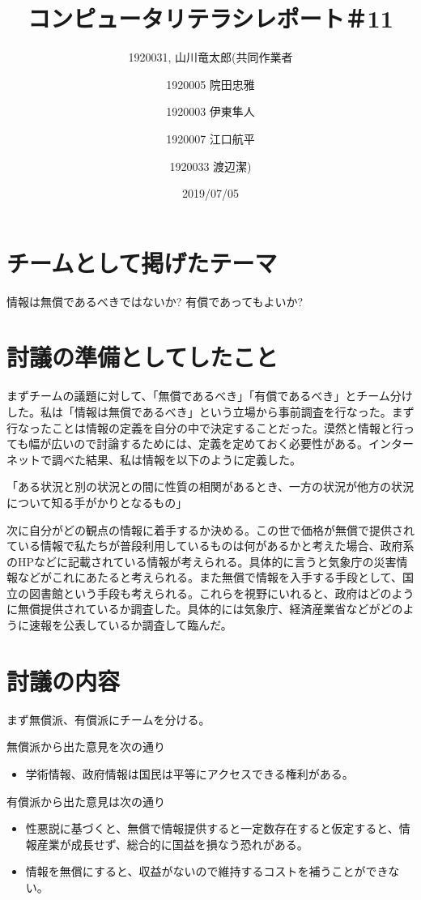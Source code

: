 \documentclass[12pt,a4j]{jarticle}
\begin{document}
\title{コンピュータリテラシレポート＃11}
\author{1920031, 山川竜太郎(共同作業者  \and 1920005 院田忠雅 \and 1920003 伊東隼人 \and 1920007 江口航平 \and 1920033 渡辺潔)}
\date{2019/07/05}
\maketitle

\section{チームとして掲げたテーマ}
情報は無償であるべきではないか? 有償であってもよいか?

\section{討議の準備としてしたこと}
まずチームの議題に対して、「無償であるべき」「有償であるべき」とチーム分けした。私は「情報は無償であるべき」という立場から事前調査を行なった。まず行なったことは情報の定義を自分の中で決定することだった。漠然と情報と行っても幅が広いので討論するためには、定義を定めておく必要性がある。インターネットで調べた結果、私は情報を以下のように定義した。

「ある状況と別の状況との間に性質の相関があるとき、一方の状況が他方の状況について知る手がかりとなるもの」

次に自分がどの観点の情報に着手するか決める。この世で価格が無償で提供されている情報で私たちが普段利用しているものは何があるかと考えた場合、政府系のHPなどに記載されている情報が考えられる。具体的に言うと気象庁の災害情報などがこれにあたると考えられる。また無償で情報を入手する手段として、国立の図書館という手段も考えられる。これらを視野にいれると、政府はどのように無償提供されているか調査した。具体的には気象庁、経済産業省などがどのように速報を公表しているか調査して臨んだ。

\section{討議の内容}
まず無償派、有償派にチームを分ける。

無償派から出た意見を次の通り

\begin{itemize}
\item 学術情報、政府情報は国民は平等にアクセスできる権利がある。
\end{itemize}

有償派から出た意見は次の通り

\begin{itemize}
\item 性悪説に基づくと、無償で情報提供すると一定数存在すると仮定すると、情報産業が成長せず、総合的に国益を損なう恐れがある。
\item 情報を無償にすると、収益がないので維持するコストを補うことができない。
\end{itemize}
\end{document}

